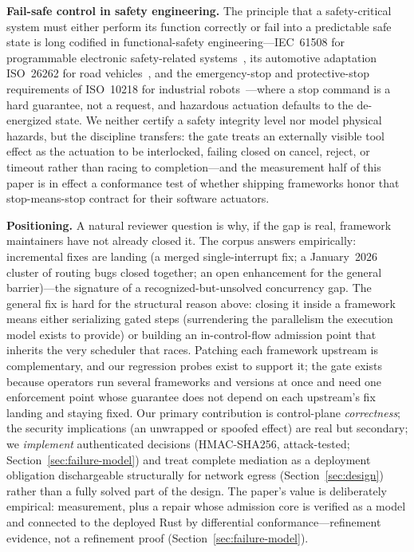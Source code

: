 \documentclass[10pt,journal,compsoc]{IEEEtran}
\begin{document}
\textbf{Fail-safe control in safety engineering.} The principle that a
safety-critical system must either perform its function correctly or fail into a
predictable safe state is long codified in functional-safety
engineering---IEC~61508 for programmable electronic
safety-related systems~\cite{iec61508}, its automotive adaptation ISO~26262 for
road vehicles~\cite{iso26262}, and the emergency-stop and protective-stop
requirements of ISO~10218 for industrial robots~\cite{iso10218}---where a stop command is a hard guarantee, not a request, and hazardous actuation defaults to the de-energized state. We neither certify a safety integrity level nor model physical hazards, but the discipline transfers: the gate treats an externally visible tool effect as the actuation to be interlocked, failing closed on cancel, reject, or timeout rather than racing to completion---and the measurement half of this paper is in effect a conformance test of whether shipping frameworks honor that stop-means-stop contract for their software actuators.

\textbf{Positioning.} A natural reviewer question is why, if the gap is real,
framework maintainers have not already closed it. The corpus answers empirically: incremental fixes are landing (a merged single-interrupt fix; a January~2026 cluster of routing bugs closed together; an open enhancement for the general barrier)---the signature of a recognized-but-unsolved concurrency gap. The general fix is hard for the structural reason
above: closing it inside a framework means either serializing gated steps
(surrendering the parallelism the execution model exists to provide) or
building an in-control-flow admission point that inherits the very scheduler
that races. Patching each framework upstream is complementary, and
our regression probes exist to support it; the gate exists because operators
run several frameworks and versions at once and need one enforcement point
whose guarantee does not depend on each upstream's fix landing and staying
fixed. Our primary contribution is control-plane
\emph{correctness}; the security implications (an unwrapped or spoofed effect)
are real but secondary; we \emph{implement} authenticated decisions
(HMAC-SHA256, attack-tested; Section~\ref{sec:failure-model}) and treat
complete mediation as a deployment obligation dischargeable structurally
for network egress (Section~\ref{sec:design}) rather than a fully solved
part of the design. The paper's value is deliberately empirical: measurement, plus a repair whose admission core is verified as a model and connected to the deployed Rust by differential conformance---refinement evidence, not a refinement proof (Section~\ref{sec:failure-model}).
\end{document}
